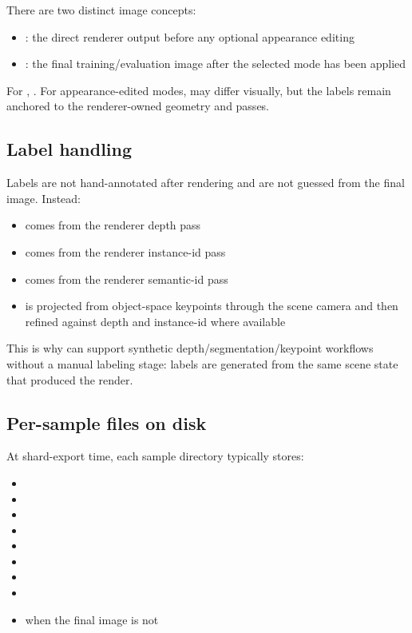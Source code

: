 There are two distinct image concepts:
\begin{itemize}
  \item {}: the direct renderer output before any optional appearance editing
  \item {}: the final training/evaluation image after the selected mode has been applied
\end{itemize}

For , . For appearance-edited modes,  may differ visually, but the labels remain anchored to the renderer-owned geometry and passes.

\subsection{Label handling}

Labels are not hand-annotated after rendering and are not guessed from the final image. Instead:
\begin{itemize}
  \item {} comes from the renderer depth pass
  \item {} comes from the renderer instance-id pass
  \item {} comes from the renderer semantic-id pass
  \item {} is projected from object-space keypoints through the scene camera and then refined against depth and instance-id where available
\end{itemize}

This is why  can support synthetic depth/segmentation/keypoint workflows without a manual labeling stage: labels are generated from the same scene state that produced the render.

\subsection{Per-sample files on disk}

At shard-export time, each sample directory typically stores:
\begin{itemize}
  \item {}
  \item {}
  \item {}
  \item {}
  \item {}
  \item {}
  \item {}
  \item {}
  \item {} when the final image is not 
\end{itemize}

